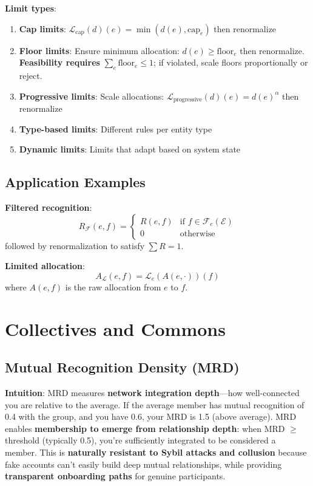 \documentclass[11pt,a4paper]{article}
\theoremstyle{definition}
\theoremstyle{remark}
\newcommand{\E}{\mathcal{E}}
\newcommand{\F}{\mathcal{F}}
\begin{document}
\textbf{Limit types}:
\begin{enumerate}
\item \textbf{Cap limits}: $\mathcal{L}_{\text{cap}}(d)(e) = \min(d(e), \text{cap}_e)$ then renormalize
\item \textbf{Floor limits}: Ensure minimum allocation: $d(e) \ge \text{floor}_e$ then renormalize. \textbf{Feasibility requires} $\sum_e \text{floor}_e \le 1$; if violated, scale floors proportionally or reject.
\item \textbf{Progressive limits}: Scale allocations: $\mathcal{L}_{\text{progressive}}(d)(e) = d(e)^\alpha$ then renormalize
\item \textbf{Type-based limits}: Different rules per entity type
\item \textbf{Dynamic limits}: Limits that adapt based on system state
\end{enumerate}

\subsection{Application Examples}

\textbf{Filtered recognition}:
\[ R_{\F}(e,f) = \begin{cases}
R(e,f) & \text{if } f \in \F_e(\E) \\
0 & \text{otherwise}
\end{cases} \]
followed by renormalization to satisfy $\sum R=1$.

\textbf{Limited allocation}:
\[ A_{\mathcal{L}}(e,f) = \mathcal{L}_e(A(e,\cdot))(f) \]
where $A(e,f)$ is the raw allocation from $e$ to $f$.

\section{Collectives and Commons}

\subsection{Mutual Recognition Density (MRD)}

\textbf{Intuition}: MRD measures \textbf{network integration depth}---how well-connected you are relative to the average. If the average member has mutual recognition of 0.4 with the group, and you have 0.6, your MRD is 1.5 (above average). MRD enables \textbf{membership to emerge from relationship depth}: when MRD $\ge$ threshold (typically 0.5), you're sufficiently integrated to be considered a member. This is \textbf{naturally resistant to Sybil attacks and collusion} because fake accounts can't easily build deep mutual relationships, while providing \textbf{transparent onboarding paths} for genuine participants.
\end{document}
